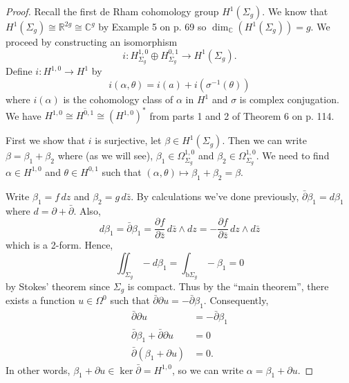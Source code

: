 \documentclass[11pt,oneside,english,reqno]{amsart}
\theoremstyle{definition}
\newcommand{\pp}[2]{\frac{\partial{#1}}{\partial{#2}}}
\newcommand{\MB}[1]{\mathbb{#1}}
\begin{document}
\begin{enumerate}[leftmargin=*]
\begin{proof}
Recall the first de Rham cohomology group $H^1(\Sigma_g)$. We know that $H^1(\Sigma_g)\cong\MB{R}^{2g}\cong\MB{C}^g$ by Example 5 on p. 69 so $\dim_\MB{C} (H^1(\Sigma_g))=g$. We proceed by constructing an isomorphism 
\[
i:H^{1,0}_{\Sigma_g}\oplus H^{0,1}_{\Sigma_g}\to H^1(\Sigma_g).
\]
Define $i:H^{1,0}\to H^1$ by 
\[
i(\alpha,\theta)=i(a)+i(\sigma^{-1}(\theta))
\]
where $i(\alpha)$ is the cohomology class of $\alpha$ in $H^1$ and $\sigma$ is complex conjugation. We have $H^{1,0}\cong \overline{H^{0,1}}\cong (H^{1,0})^*$ from parts 1 and 2 of Theorem 6 on p. 114.

First we show that $i$ is surjective, let $\beta\in H^1(\Sigma_g)$. Then we can write $\beta=\beta_1+\beta_2$ where (as we will see), $\beta_1\in\Omega^{1,0}_{\Sigma_g}$ and $\beta_2\in\Omega^{1,0}_{\Sigma_g}$. We need to find $\alpha\in H^{1,0}$ and $\theta\in H^{0,1}$ such that $(\alpha,\theta)\mapsto \beta_1+\beta_2=\beta$. 

Write $\beta_1=f\,dz$ and $\beta_2=g\,d\bar z$. By calculations we've done previously, $\bar\partial \beta_1=d\beta_1$ where $d=\partial+\bar\partial$. Also,
\[
d\beta_1=\bar\partial \beta_1=\pp{f}{\bar z}\,d\bar z\wedge dz=-\pp{f}{\bar z}\,dz\wedge d\bar z
\]
which is a 2-form. Hence,
\[
\iint_{\Sigma_g}-d\beta_1=\int_{\text{b}\Sigma_g}-\beta_1=0
\]
by Stokes' theorem since $\Sigma_g$ is compact. Thus by the ``main theorem'', there exists a function $u\in \Omega^0$ such that $\bar\partial\partial u=-\bar\partial\beta_1$. Consequently,
\begin{align*}
\bar\partial\partial u&=-\bar\partial\beta_1\\
\bar\partial\beta_1+\bar\partial\partial u&=0\\
\bar\partial(\beta_1+\partial u)&=0.
\end{align*}
In other words, $\beta_1+\partial u\in\ker\bar\partial=H^{1,0}$, so we can write $\alpha=\beta_1+\partial u$.






\end{proof}
\end{enumerate}
\end{document}
